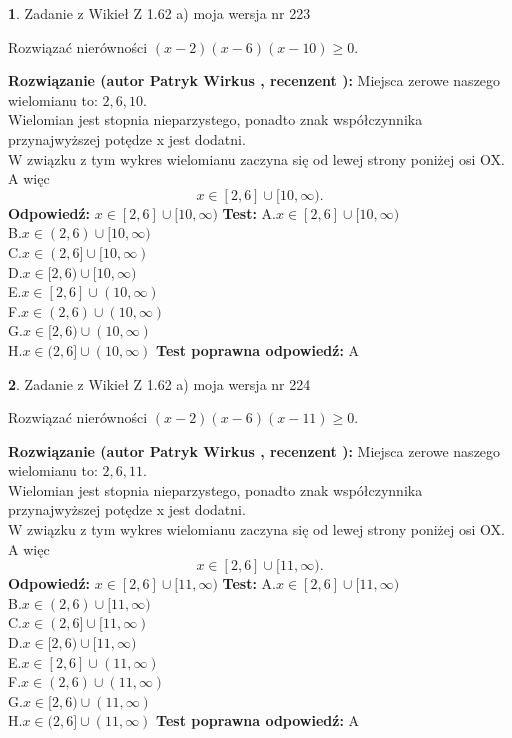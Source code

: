 \documentclass[12pt, a4paper]{article}
\theoremstyle{definition} %
\newtheorem{zad}{}
\newcommand{\zadStart}[1]{\begin{zad}#1\newline}
\newcommand{\zadStop}{\end{zad}}
\newcommand{\rozwStart}[2]{\noindent \textbf{Rozwiązanie (autor #1 , recenzent #2): }\newline}
\newcommand{\rozwStop}{\newline}
\newcommand{\odpStart}{\noindent \textbf{Odpowiedź:}\newline}
\newcommand{\odpStop}{\newline}
\newcommand{\testStart}{\noindent \textbf{Test:}\newline}
\newcommand{\testStop}{\newline}
\newcommand{\kluczStart}{\noindent \textbf{Test poprawna odpowiedź:}\newline}
\newcommand{\kluczStop}{\newline}
\begin{document}
\zadStart{Zadanie z Wikieł Z 1.62 a) moja wersja nr 223}

Rozwiązać nierówności $(x-2)(x-6)(x-10)\ge0$.
\zadStop
\rozwStart{Patryk Wirkus}{}
Miejsca zerowe naszego wielomianu to: $2, 6, 10$.\\
Wielomian jest stopnia nieparzystego, ponadto znak współczynnika przy\linebreak najwyższej potędze x jest dodatni.\\ W związku z tym wykres wielomianu zaczyna się od lewej strony poniżej osi OX. A więc $$x \in [2,6] \cup [10,\infty).$$
\rozwStop
\odpStart
$x \in [2,6] \cup [10,\infty)$
\odpStop
\testStart
A.$x \in [2,6] \cup [10,\infty)$\\
B.$x \in (2,6) \cup [10,\infty)$\\
C.$x \in (2,6] \cup [10,\infty)$\\
D.$x \in [2,6) \cup [10,\infty)$\\
E.$x \in [2,6] \cup (10,\infty)$\\
F.$x \in (2,6) \cup (10,\infty)$\\
G.$x \in [2,6) \cup (10,\infty)$\\
H.$x \in (2,6] \cup (10,\infty)$
\testStop
\kluczStart
A
\kluczStop



\zadStart{Zadanie z Wikieł Z 1.62 a) moja wersja nr 224}

Rozwiązać nierówności $(x-2)(x-6)(x-11)\ge0$.
\zadStop
\rozwStart{Patryk Wirkus}{}
Miejsca zerowe naszego wielomianu to: $2, 6, 11$.\\
Wielomian jest stopnia nieparzystego, ponadto znak współczynnika przy\linebreak najwyższej potędze x jest dodatni.\\ W związku z tym wykres wielomianu zaczyna się od lewej strony poniżej osi OX. A więc $$x \in [2,6] \cup [11,\infty).$$
\rozwStop
\odpStart
$x \in [2,6] \cup [11,\infty)$
\odpStop
\testStart
A.$x \in [2,6] \cup [11,\infty)$\\
B.$x \in (2,6) \cup [11,\infty)$\\
C.$x \in (2,6] \cup [11,\infty)$\\
D.$x \in [2,6) \cup [11,\infty)$\\
E.$x \in [2,6] \cup (11,\infty)$\\
F.$x \in (2,6) \cup (11,\infty)$\\
G.$x \in [2,6) \cup (11,\infty)$\\
H.$x \in (2,6] \cup (11,\infty)$
\testStop
\kluczStart
A
\kluczStop
\end{document}
